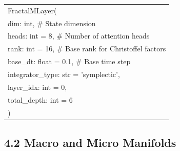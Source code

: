 \documentclass[12pt]{article}
\begin{document}
\begin{center}
\begin{tabular}{|l|}
\hline
FractalMLayer( \\
\quad dim: int,                \# State dimension \\
\quad heads: int = 8,          \# Number of attention heads \\
\quad rank: int = 16,          \# Base rank for Christoffel factors \\
\quad base\_dt: float = 0.1,    \# Base time step \\
\quad integrator\_type: str = 'symplectic', \\
\quad layer\_idx: int = 0, \\
\quad total\_depth: int = 6 \\
) \\
\hline
\end{tabular}
\end{center}

\subsection{4.2 Macro and Micro Manifolds}
\end{document}
